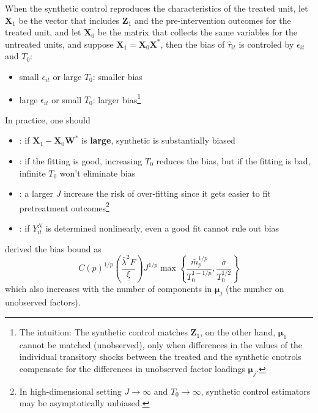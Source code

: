 \documentclass[twoside]{article}
\begin{document}
When the synthetic control reproduces the characteristics of the treated unit, let $\mathbf{X}_1$ be the vector that includes $\mathbf{Z}_1$ and the pre-intervention outcomes for the treated unit, and let $\mathbf{X}_0$ be the matrix that collects the same variables for the untreated units, and suppose $\mathbf{X}_1=\mathbf{X}_0\mathbf{X}^*$,
then the bias of $\hat{\tau}_{it}$ is controled by $\epsilon_{it}$ and $T_0$:
\begin{itemize}
    \item small $\epsilon_{it}$ or large $T_0$: smaller bias
    \item large $\epsilon_{it}$ or small $T_0$: larger bias\footnote{The intuition: The synthetic control matches $\mathbf{Z}_1$, on the other hand, $\boldsymbol{\mu}_1$ cannot be matched (unobserved), only when differences in the values of the individual transitory shocks between the treated and the synthetic cnotrols compensate for the differences in unobserved factor loadings $\boldsymbol{\mu}_j$.} 
\end{itemize}
In practice, one should 
\begin{itemize}
    \item {}: if $\mathbf{X}_1 - \mathbf{X}_0\mathbf{W}^*$ is \textbf{large}, synthetic is substantially biased 
    \item {}: if the fitting is good, increasing $T_0$ reduces the bias, but if the fitting is bad, infinite $T_0$ won't eliminate bias
    \item {}: a larger $J$ increase the risk of over-fitting since it gets easier to fit pretreatment outcomes\footnote{In high-dimensional setting $J\rightarrow\infty$ and $T_0\rightarrow \infty$, synthetic control estimators may be asymptotically unbiased.}
    \item {}: if $Y^N_{it}$ is determined nonlinearly, even a good fit cannot rule out bias
\end{itemize}
\citet{abadie2010synthetic} derived the bias bound as $$ C(p)^{1/p} \left( \frac{\bar{\lambda}^2 F}{\underline{\xi}} \right) J^{1/p} \max  \left\{ \frac{\bar{m}^{1/p}_p}{T^{1-1/p}_0},\frac{\bar{\sigma}}{T^{1/2}_0} \right\} $$
which also increases with the number of components in $\boldsymbol{\mu}_j$ (the number on unobserved factors).
\end{document}
